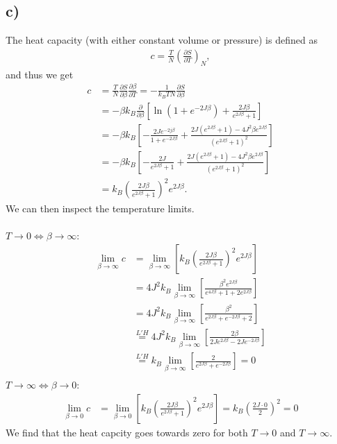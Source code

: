 \documentclass[reprint, amsmath, amssymb, aps, onecolumn]{revtex4-2}
\newcommand{\dd}[3]{\left(\frac{\partial #1}{\partial #2}\right)_{#3}}
\begin{document}
\subsection*{c)}
\noindent The heat capacity (with either constant volume or pressure) is defined as
\begin{align*}
  c = \frac{T}{N}\dd{S}{T}{N},
\end{align*}
and thus we get
\begin{align*}
  c &= \frac{T}{N}\frac{\partial S}{\partial \beta} \frac{\partial \beta}{\partial T} = -\frac{1}{k_B T N} \frac{\partial S}{\partial \beta} \\
  &= -\beta k_B \frac{\partial}{\partial \beta}\left[\ln{(1 + e^{-2J\beta})}
 + \frac{2J\beta}{e^{2J\beta} + 1} \right] \\
 &= -\beta k_B \left[-\frac{2Je^{-2j\beta}}{1 + e^{-2J\beta}} + \frac{2J(e^{2J\beta} + 1) - 4J^2\beta e^{2J\beta}}{(e^{2J\beta} + 1)^2} \right] \\
 &= -\beta k_B \left[-\frac{2J}{e^{2J\beta} + 1} + \frac{2J(e^{2J\beta} + 1) - 4J^2\beta e^{2J\beta}}{(e^{2J\beta} + 1)^2} \right] \\
  &= k_B \left( \frac{2J\beta}{e^{2J\beta} + 1} \right)^2 e^{2J\beta}.
\end{align*}
We can then inspect the temperature limits. \\
\\
$T \to 0 \Longleftrightarrow \beta \to \infty:$
\begin{align*}
   \lim_{\beta\to\infty} c &= \lim_{\beta\to\infty} \left[ k_B \left( \frac{2J\beta}{e^{2J\beta} + 1} \right)^2 e^{2J\beta} \right]\\
   &=  4J^2k_B \lim_{\beta\to\infty} \left[ \frac{\beta^2 e^{2J\beta}}{e^{4J\beta} + 1 + 2e^{2J\beta}} \right] \\
   &=  4J^2k_B \lim_{\beta\to\infty} \left[ \frac{\beta^2 }{e^{2J\beta} + e^{-2J\beta} + 2} \right] \\
   &\overset{L'H}=  4J^2k_B \lim_{\beta\to\infty} \left[ \frac{2\beta }{2Je^{2J\beta}  -2Je^{-2J\beta}} \right] \\
   &\overset{L'H}=  k_B \lim_{\beta\to\infty} \left[ \frac{2 }{e^{2J\beta} + e^{-2J\beta}} \right] = 0\\
\end{align*}
$T \to \infty \Longleftrightarrow \beta \to 0:$
\begin{align*}
  \lim_{\beta\to0} c &= \lim_{\beta\to0} \left[ k_B \left( \frac{2J\beta}{e^{2J\beta} + 1} \right)^2 e^{2J\beta} \right] = k_B \left(\frac{2J\cdot0}{2}\right)^2 = 0
\end{align*}
We find that the heat capcity goes towards zero for both $T\to0$ and $T\to\infty$.
\end{document}
